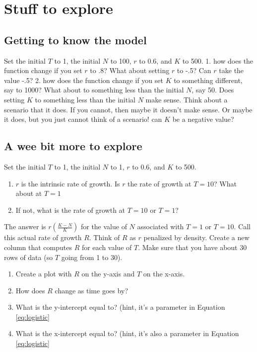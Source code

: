 \documentclass[]{book}
\providecommand{\tightlist}{%
  \setlength{\itemsep}{0pt}\setlength{\parskip}{0pt}}
\begin{document}
\section{Stuff to explore}\label{stuff-to-explore}

\subsection{Getting to know the model}\label{getting-to-know-the-model}

Set the initial \(T\) to 1, the initial \(N\) to 100, \(r\) to 0.6, and
\(K\) to 500. 1. how does the function change if you set \(r\) to .8?
What about setting \(r\) to -.5? Can \(r\) take the value -.5? 2. how
does the function change if you set \(K\) to something different, say to
1000? What about to something less than the initial \(N\), say 50. Does
setting \(K\) to something less than the initial \(N\) make sense. Think
about a scenario that it does. If you cannot, then maybe it doesn't make
sense. Or maybe it does, but you just cannot think of a scenario! can
\(K\) be a negative value?

\subsection{A wee bit more to explore}\label{a-wee-bit-more-to-explore}

Set the initial \(T\) to 1, the initial \(N\) to 1, \(r\) to 0.6, and
\(K\) to 500.

\begin{enumerate}
\def\labelenumi{\arabic{enumi}.}
\setcounter{enumi}{2}
\tightlist
\item
  \(r\) is the intrinsic rate of growth. Is \(r\) the rate of growth at
  \(T=10\)? What about at \(T=1\)
\item
  If not, what is the rate of growth at \(T=10\) or \(T=1\)?
\end{enumerate}

The answer is \(r(\frac{K-N}{K})\) for the value of \(N\) associated
with \(T=1\) or \(T=10\). Call this actual rate of growth \(R\). Think
of \(R\) as \(r\) penalized by density. Create a new column that
computes \(R\) for each value of \(T\). Make sure that you have about 30
rows of data (so \(T\) going from 1 to 30).

\begin{enumerate}
\def\labelenumi{\arabic{enumi}.}
\setcounter{enumi}{4}
\tightlist
\item
  Create a plot with \(R\) on the y-axis and \(T\) on the x-axis.
\item
  How does \(R\) change as time goes by?
\item
  What is the y-intercept equal to? (hint, it's a parameter in Equation
  \eqref{eq:logistic}
\item
  What is the x-intercept equal to? (hint, it's also a parameter in
  Equation \eqref{eq:logistic}
\end{enumerate}
\end{document}
